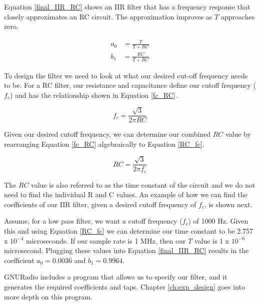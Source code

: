Equation \ref{final_IIR_RC} shows an IIR filter that has a frequency response that closely approximates an RC circuit.  The approximation improves as $T$ approaches zero.

\begin{align}
a_0 &= \frac{T}{T+RC} \\
b_1 &= \frac{RC}{T+RC}
\end{align}


To design the filter we need to look at what our desired cut-off frequency needs to be.  For a RC filter, our resistance and capacitance define our cutoff frequency ($f_c$) and has the relationship shown in Equation \ref{fc_RC}.

\begin{equation}\label{fc_RC}
f_c=\frac{\sqrt{3}}{2\pi RC}
\end{equation}

Given our desired cutoff frequency, we can determine our combined $RC$ value by rearranging Equation \ref{fc_RC} algebraically to Equation \ref{RC_fc}.

\begin{equation}\label{RC_fc}
RC=\frac{\sqrt{3}}{2\pi f_c}
\end{equation}

The $RC$ value is also referred to as the time constant of the circuit and we do not need to find the individual R and C values.  An example of how we can find the coefficients of our IIR filter, given a desired cutoff frequency of $f_c$, is shown next.  

Assume, for a low pass filter, we want a cutoff frequency ($f_c$) of 1000 Hz.  Given this and using Equation \ref{RC_fc} we can determine our time constant to be 2.757 x $10^{-4}$ microseconds.  If our sample rate is 1 MHz, then our $T$ value is 1 x $10^{-6}$ microsecond.  Plugging these values into Equation \ref{final_IIR_RC} results in the coefficient $a_0 = 0.0036$ and $b_1=0.9964$.




GNURadio includes a program that allows us to specify our filter, and it generates the required coefficients and taps.  Chapter \ref{ch:exp_design} goes into more depth on this program.

